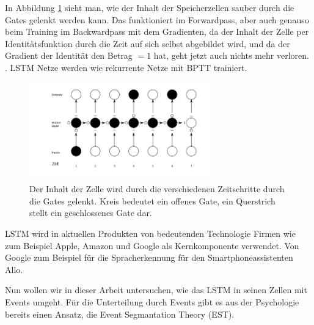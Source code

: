 In Abbildung \ref{img:lstm2} sieht man, wie der Inhalt der Speicherzellen sauber durch die Gates gelenkt werden kann. Das funktioniert im Forwardpass, aber auch genauso beim Training im Backwardpass mit dem Gradienten, da der Inhalt der Zelle per Identitätsfunktion durch die Zeit auf sich selbst abgebildet wird, und da der Gradient der Identität den Betrag \( = 1 \) hat, geht jetzt auch nichts mehr verloren. \cite{bib:lstm}. LSTM Netze werden wie rekurrente Netze mit BPTT trainiert.
\begin{figure}
	\centering
	\includegraphics[width=0.7\textwidth, height=160px]{pics/lstm2.png}	
	\caption{Der Inhalt der Zelle wird durch die verschiedenen Zeitschritte durch die Gates gelenkt. Kreis bedeutet ein offenes Gate, ein Querstrich stellt ein geschlossenes Gate dar.    \cite{bib:graves}}
	\label{img:lstm2}
\end{figure}

LSTM wird in aktuellen Produkten von bedeutenden Technologie Firmen wie zum Beispiel Apple\cite{bib:apple}, Amazon\cite{bib:amazon} und Google als Kernkomponente verwendet. Von Google zum Beispiel für die Spracherkennung für den Smartphoneassistenten Allo\cite{bib:allo}. 

Nun wollen wir in dieser Arbeit untersuchen, wie das LSTM in seinen Zellen mit Events umgeht. Für die Unterteilung durch Events gibt es aus der Psychologie bereits einen Ansatz, die Event Segmantation Theory (EST).


